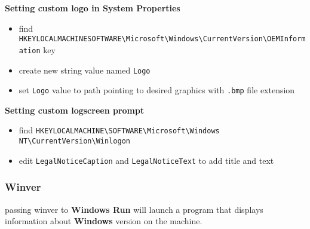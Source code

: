\documentclass[11pt,a4paper]{article}
\def\bs{\textbackslash}
\def\us{\textunderscore}
\begin{document}
\textbf{Setting custom logo in System Properties }
\begin{itemize}
\item find \texttt{HKEY{\us}LOCAL{\us}MACHINE{\us}SOFTWARE{\bs}Microsoft{\bs}Windows{\bs}CurrentVersion{\bs}OEMInformation} key
\item create new string value named \texttt{Logo}
\item set \texttt{Logo} value to path pointing to desired graphics with \texttt{.bmp} file extension
\end{itemize}

\textbf{Setting custom logscreen prompt}
\begin{itemize}
\item find \texttt{HKEY{\us}LOCAL{\us}MACHINE{\bs}SOFTWARE{\bs}Microsoft{\bs}Windows NT{\bs}CurrentVersion{\bs}Winlogon}
\item edit \texttt{LegalNoticeCaption} and \texttt{LegalNoticeText} to add title and text
\end{itemize}

\subsubsection{Winver}
passing winver to \textbf{Windows Run} will launch a program that displays information about \textbf{Windows} version on the machine.
\end{document}
